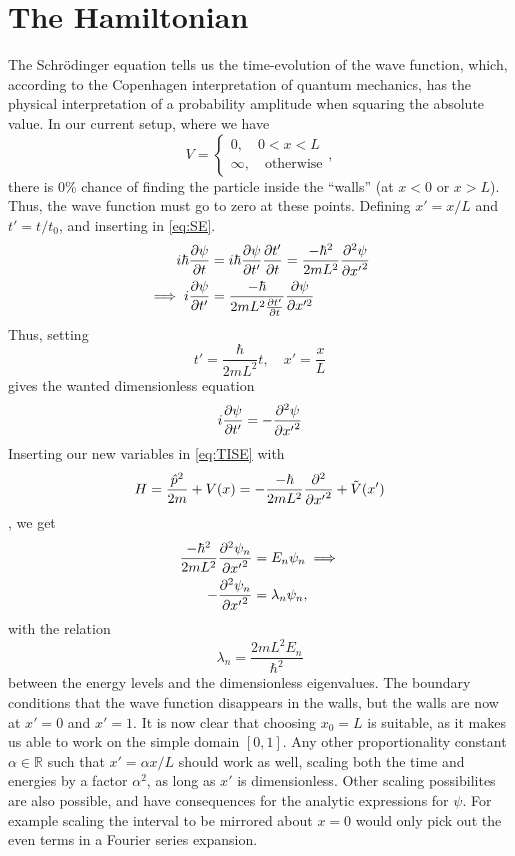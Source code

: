 \section{The Hamiltonian}

The Schrödinger equation tells us the time-evolution of the wave function, which, according to the Copenhagen interpretation of quantum mechanics, has the physical interpretation of a probability amplitude when squaring the absolute value. In our current setup, where we have
\begin{equation} 
V = \begin{cases}
0,\quad 0<x<L \\
\infty,\quad \text{otherwise}
\end{cases},
\end{equation}
there is 0\% chance of finding the particle inside the ``walls'' (at $x<0$ or $x> L$). Thus, the wave function must go to zero at these points. Defining $x' = x/L$ and $t'=t/t_0$, and inserting in \cref{eq:SE}.
\begin{align*} 
i\hbar\pdv{\psi}{t} &= i\hbar\pdv{\psi}{t'}\pdv{t'}{t}= \frac{-\hbar^2}{2mL^2}\pdv[2]{\psi}{{x'}}\\
\implies i\pdv{\psi}{t'} &= \frac{-\hbar}{2mL^2 \pdv{t'}{t}}\pdv{\psi}{x'^2}
\end{align*}
Thus, setting
\begin{equation}
t' = \frac{\hbar}{2mL^2}t,\quad x' = \frac{x}{L}
\end{equation}
gives the wanted dimensionless equation
\begin{equation}
\label{eq:SE_dimensionless}
i\pdv{\psi}{t'} = -\pdv[2]{\psi}{{x'}}
\end{equation}
Inserting our new variables in \cref{eq:TISE} with \[H = \frac{\hat p^2}{2m} + V(x) =  -\frac{-\hbar}{2mL^2} \pdv[2]{{x'}} + \tilde{V}(x')\], we get
\begin{align} 
\frac{-\hbar^2}{2mL^2}\pdv[2]{\psi_n}{{x'}} &= E_n\psi_n \implies \nonumber\\
\label{eq:eig}
-\pdv[2]{\psi_n}{{x'}} &= \lambda_n\psi_n,
\end{align}
with the relation 
\begin{equation} 
\lambda_n = \frac{2mL^2 E_n}{\hbar^2}
\end{equation}
between the energy levels and the dimensionless eigenvalues. The boundary conditions that the wave function disappears in the walls, but the walls are now at $x' = 0$ and $x' = 1$. It is now clear that choosing $x_0 = L$ is suitable, as it makes us able to work on the simple domain $[0,1]$. Any other proportionality constant $\alpha\in \mathbb{R}$ such that $x' = \alpha x/ L$ should work as well, scaling both the time and energies by a factor $\alpha^2 $, as long as $x'$ is dimensionless. Other scaling possibilites are also possible, and have consequences for the analytic expressions for $\psi$. For example scaling the interval to be mirrored about $x = 0$ would only pick out the even terms in a Fourier series expansion.

